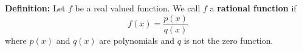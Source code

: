 \documentclass{article}
\begin{document}
	\textbf{Definition:} Let $f$ be a real valued function. We call $f$ a \textbf{rational function} if
	$$f(x) = \frac{p(x)}{q(x)}$$
	where $p(x)$ and $q(x)$ are polynomials and $q$ is not the zero function.
\end{document}
